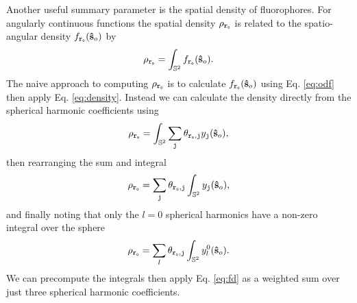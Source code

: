 \documentclass[11pt]{article}
\providecommand{\so}{\mathbf{\hat{s}}_o}
\providecommand{\mbb}[1]{\mathbb{#1}}
\providecommand{\tb}[1]{\textbf{#1}}
\providecommand{\ttt}[1]{\texttt{#1}}
\begin{document}
Another useful summary parameter is the spatial density of fluorophores. For
angularly continuous functions the spatial density
$\rho_{\ttt{\tb{r}}_{\ttt{o}}}$ is related to the spatio-angular density
$f_{\ttt{\tb{r}}_{\ttt{o}}}(\so)$ by
\begin{align}
  \rho_{\ttt{\tb{r}}_{\ttt{o}}} = \int_{\mbb{S}^2}f_{\ttt{\tb{r}}_{\ttt{o}}}(\so). \label{eq:density}
\end{align}
The naive approach to computing $\rho_{\ttt{\tb{r}}_{\ttt{o}}}$ is to calculate
$f_{\ttt{\tb{r}}_{\ttt{o}}}(\so)$ using Eq. \ref{eq:odf} then apply Eq.
\ref{eq:density}. Instead we can calculate the density directly from the spherical
harmonic coefficients using
\begin{align}
  \rho_{\ttt{\tb{r}}_{\ttt{o}}} = \int_{\mbb{S}^2}\sum_{\ttt{j}} \theta_{\ttt{\tb{r}}_{\ttt{o}},\ttt{j}}y_{\ttt{j}}(\so), 
\end{align}
then rearranging the sum and integral
\begin{align}
  \rho_{\ttt{\tb{r}}_{\ttt{o}}} = \sum_{\ttt{j}} \theta_{\ttt{\tb{r}}_{\ttt{o}},\ttt{j}}\int_{\mbb{S}^2}y_{\ttt{j}}(\so), 
\end{align}
and finally noting that only the $l=0$ spherical harmonics have a non-zero
integral over the sphere
\begin{align}
  \rho_{\ttt{\tb{r}}_{\ttt{o}}} = \sum_{l}\theta_{\ttt{\tb{r}}_{\ttt{o}},\ttt{j}}\int_{\mbb{S}^2}y^0_{l}(\so). \label{eq:fd}
\end{align}
We can precompute the integrals then apply Eq. \ref{eq:fd} as a weighted sum
over just three spherical harmonic coefficients.
\end{document}
